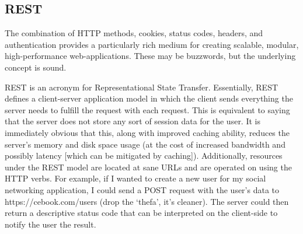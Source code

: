\documentclass[12pt]{article}
\begin{document}
\subsection{REST}
The combination of HTTP methods, cookies, status codes, headers, and authentication provides a particularly rich medium for creating scalable, modular, high-performance web-applications. These may be buzzwords, but the underlying concept is sound.
\par
REST is an acronym for Representational State Transfer. Essentially, REST defines a client-server application model in which the client sends everything the server needs to fulfill the request with each request. This is equivalent to saying that the server does not store any sort of session data for the user. It is immediately obvious that this, along with improved caching ability, reduces the server's memory and disk space usage (at the cost of increased bandwidth and possibly latency [which can be mitigated by caching]). Additionally, resources under the REST model are located at sane URLs and are operated on using the HTTP verbs. For example, if I wanted to create a new user for my social networking application, I could send a POST request with the user's data to https://cebook.com/users (drop the `thefa', it's cleaner). The server could then return a descriptive status code that can be interpreted on the client-side to notify the user the result.
\end{document}
